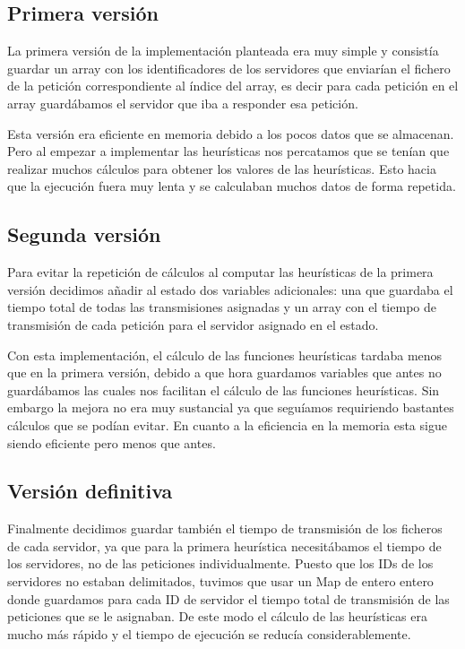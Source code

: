 \subsection{Primera versión}

La primera versión de la implementación planteada era muy simple y consistía guardar un array con los identificadores
de los servidores que enviarían el fichero de la petición correspondiente al índice del array, es decir para cada
petición en el array guardábamos el servidor que iba a responder esa petición.

Esta versión era eficiente en memoria debido a los pocos datos que se almacenan. Pero al empezar a implementar las heurísticas
nos percatamos que se tenían que realizar muchos cálculos para obtener los valores de las heurísticas. Esto hacia que la
ejecución fuera muy lenta y se calculaban muchos datos de forma repetida.

\pagebreak
\subsection{Segunda versión}
Para evitar la repetición de cálculos al computar las heurísticas de la primera versión decidimos añadir al estado
dos variables adicionales: una que guardaba el tiempo total de todas las transmisiones asignadas y un array con
el tiempo de transmisión de cada petición para el servidor asignado en el estado.

Con esta implementación, el cálculo de las funciones heurísticas tardaba menos que en la primera versión,
debido a que hora guardamos variables que antes no guardábamos las cuales nos facilitan el cálculo de las funciones heurísticas.
Sin embargo la mejora no era muy sustancial ya que seguíamos requiriendo bastantes cálculos que se podían evitar.
En cuanto a la eficiencia en la memoria esta sigue siendo eficiente pero menos que antes.

\subsection{Versión definitiva}

Finalmente decidimos guardar también el tiempo de transmisión de los ficheros de cada servidor, ya que para la primera
heurística necesitábamos el tiempo de los servidores, no de las peticiones individualmente.
Puesto que los IDs de los servidores no estaban delimitados, tuvimos que usar un Map de entero entero donde guardamos para cada ID de servidor
el tiempo total de transmisión de las peticiones que se le asignaban. De este modo el cálculo de las heurísticas era
mucho más rápido y el tiempo de ejecución se reducía considerablemente.

